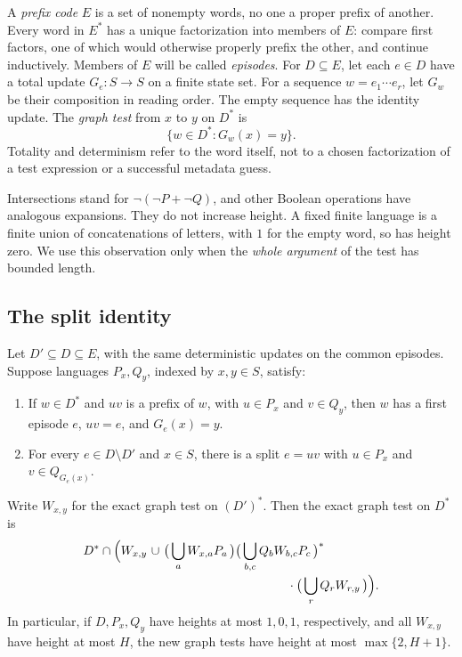 A \emph{prefix code} \(E\) is a set of nonempty words, no one a proper prefix of
another. Every word in \(E^*\) has a unique factorization into members of \(E\):
compare first factors, one of which would otherwise properly prefix the other,
and continue inductively. Members of \(E\) will be called \emph{episodes}.
For \(D\subseteq E\), let each \(e\in D\) have a total update \(G_e:S\to S\) on a
finite state set. For a sequence \(w=e_1\cdots e_r\), let \(G_w\) be their
composition in reading order. The empty sequence has the identity update.
The \emph{graph test} from \(x\) to \(y\) on \(D^*\) is
\[
                     \{w\in D^*:G_w(x)=y\}.
\]
Totality and determinism refer to the word itself, not to a chosen factorization
of a test expression or a successful metadata guess.

Intersections stand for
\(\neg(\neg P+\neg Q)\), and other Boolean operations have analogous expansions.
They do not increase height. A fixed finite language is a finite union of
concatenations of letters, with \(1\) for the empty word, so has height zero.
We use this observation only when the \emph{whole argument} of the test has
bounded length.

\subsection{The split identity}

\begin{lemma}\label{lem:split}
Let \(D'\subseteq D\subseteq E\), with the same deterministic updates on the
common episodes. Suppose languages \(P_x,Q_y\), indexed by \(x,y\in S\), satisfy:
\begin{enumerate}[label=\textup{(\roman*)}]
\item If \(w\in D^*\) and \(uv\) is a prefix of \(w\), with
\(u\in P_x\) and \(v\in Q_y\), then \(w\) has a first episode \(e\),
\(uv=e\), and \(G_e(x)=y\).
\item For every \(e\in D\setminus D'\) and \(x\in S\), there is a split
\(e=uv\) with \(u\in P_x\) and \(v\in Q_{G_e(x)}\).
\end{enumerate}
Write \(W_{x,y}\) for the exact graph test on \((D')^*\). Then the exact graph
test on \(D^*\) is
\begin{equation}\label{eq:split}
\begin{split}
D^*\cap\Bigl(
 W_{x,y}\ \cup\
 &\bigl(\,\bigcup_a W_{x,a}P_a\,\bigr)
 \bigl(\,\bigcup_{b,c}Q_bW_{b,c}P_c\,\bigr)^*\\[-2pt]
 &\hspace{35mm}\cdot
 \bigl(\,\bigcup_r Q_rW_{r,y}\,\bigr)\Bigr).
\end{split}
\end{equation}
In particular, if \(D,P_x,Q_y\) have heights at most \(1,0,1\), respectively,
and all \(W_{x,y}\) have height at most \(H\), the new graph tests have height
at most \(\max\{2,H+1\}\).
\end{lemma}

